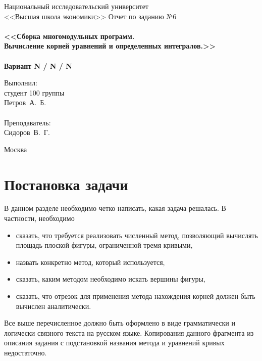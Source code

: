 \documentclass[a4paper,12pt,titlepage,draft]{article}
\newcommand{\university}{Национальный исследовательский университет\\
<<Высшая школа экономики>>}
\begin{document}
\begin{titlepage}
    \begin{center}
	{\small \sc \university}
	\vfill
	{\Large \sc Отчет по заданию №6}\\
	~\\
	{\large \bf <<Сборка многомодульных программ. \\
	Вычисление корней уравнений и определенных интегралов.>>}\\ 
	~\\
	{\large \bf Вариант N / N / N}
    \end{center}
    \begin{flushright}
	\vfill {Выполнил:\\
	студент 100 группы\\
	Петров~А.~Б.\\
	~\\
	Преподаватель:\\
	Сидоров~В.~Г.}
    \end{flushright}
    \begin{center}
	\vfill
	{\small Москва\\ \the\year{}}
    \end{center}
\end{titlepage}

\tableofcontents
\newpage

\section{Постановка задачи}

В данном разделе необходимо четко написать, какая задача решалась. В частности, необходимо
\begin{itemize}
\item сказать, что требуется реализовать численный метод, позволяющий вычислять площадь плоской фигуры,
	ограниченной тремя кривыми,
\item назвать конкретно метод, который используется,
\item сказать, каким методом необходимо искать вершины фигуры,
\item сказать, что отрезок для применения метода нахождения корней должен быть вычислен аналитически.
\end{itemize}
Все выше перечисленное должно быть оформлено в виде грамматически и логически
связного текста на русском языке. Копирования данного фрагмента из описания задания 
с подстановкой названия метода и уравнений кривых недостаточно.
\end{document}
